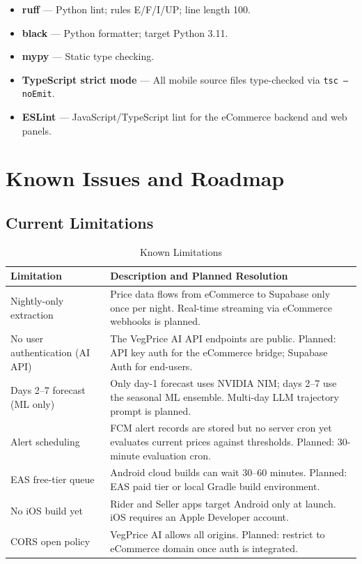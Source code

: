 \documentclass[12pt, a4paper, oneside]{report}
\begin{document}
\begin{itemize}
  \item \textbf{ruff} --- Python lint; rules E/F/I/UP; line length 100.
  \item \textbf{black} --- Python formatter; target Python 3.11.
  \item \textbf{mypy} --- Static type checking.
  \item \textbf{TypeScript strict mode} --- All mobile source files
        type-checked via \texttt{tsc --noEmit}.
  \item \textbf{ESLint} --- JavaScript/TypeScript lint for the eCommerce
        backend and web panels.
\end{itemize}

\chapter{Known Issues and Roadmap}

\section{Current Limitations}

\begin{table}[H]
\centering
\caption{Known Limitations}
\label{tab:limitations}
\begin{tabularx}{\textwidth}{@{} L{4.2cm} X @{}}
\toprule
\textbf{Limitation} & \textbf{Description and Planned Resolution} \\
\midrule
Nightly-only extraction
  & Price data flows from eCommerce to Supabase only once per night.
    Real-time streaming via eCommerce webhooks is planned. \\[4pt]
No user authentication (AI API)
  & The VegPrice AI API endpoints are public. Planned: API key auth for
    the eCommerce bridge; Supabase Auth for end-users. \\[4pt]
Days 2--7 forecast (ML only)
  & Only day-1 forecast uses NVIDIA NIM; days 2--7 use the seasonal
    ML ensemble. Multi-day LLM trajectory prompt is planned. \\[4pt]
Alert scheduling
  & FCM alert records are stored but no server cron yet evaluates current
    prices against thresholds. Planned: 30-minute evaluation cron. \\[4pt]
EAS free-tier queue
  & Android cloud builds can wait 30--60 minutes. Planned: EAS paid tier
    or local Gradle build environment. \\[4pt]
No iOS build yet
  & Rider and Seller apps target Android only at launch. iOS requires an
    Apple Developer account. \\[4pt]
CORS open policy
  & VegPrice AI allows all origins. Planned: restrict to eCommerce
    domain once auth is integrated. \\
\bottomrule
\end{tabularx}
\end{table}
\end{document}
